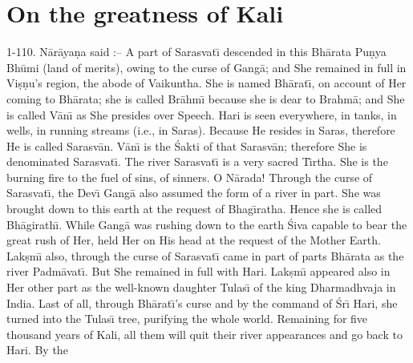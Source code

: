 \chapter{On the greatness of Kali}

1-110. N\=ar\=aya\d{n}a said :-- A part of Sarasvat\={\i} descended in this Bh\=arata Pu\d{n}ya Bh\=umi (land of merits), owing to the curse of Gang\=a; and She remained in full in Vi\d{s}\d{n}u's region, the abode of Vaikuntha. She is named Bh\=arat\={\i}, on account of Her coming to Bh\=arata; she is called Br\=ahm\={\i} because she is dear to Brahm\=a; and She is called V\=an\={\i} as She presides over Speech. Hari is seen everywhere, in tanks, in wells, in running streams (i.e., in Saras). Because He resides in Saras, therefore He is called Sarasv\=an. V\=an\={\i} is the \'Sakti of that Sarasv\=an; therefore She is denominated Sarasvat\={\i}. The river Sarasvat\={\i} is a very sacred T\={\i}rtha. She is the burning fire to the fuel of sins, of sinners. O N\=arada! Through the curse of Sarasvat\={\i}, the Dev\={\i} Gang\=a also assumed the form of a river in part. She was brought down to this earth at the request of Bhag\={\i}ratha. Hence she is called Bh\=agirath\={\i}. While Gang\=a was rushing down to the earth \'Siva capable to bear the great rush of Her, held Her on His head at the request of the Mother Earth. Lak\d{s}m\={\i} also, through the curse of Sarasvat\={\i} came in part of parts Bh\=arata as the river Padm\=avat\={\i}. But She remained in full with Hari. Lak\d{s}m\={\i} appeared also in Her other part as the well-known daughter Tulas\={\i} of the king Dharmadhvaja in India. Last of all, through Bh\=arat\={\i}'s curse and by the command of \'Sr\={\i} Hari, she turned into the Tulas\={\i} tree, purifying the whole world. Remaining for five thousand years of Kali, all them will quit their river appearances and go back to Hari. By the

